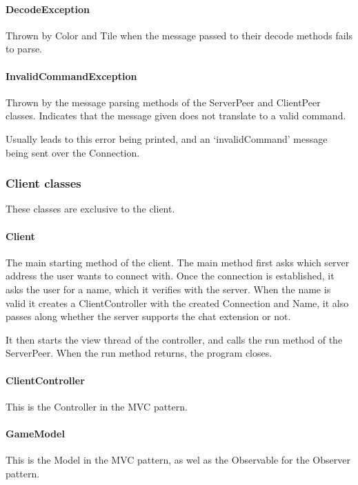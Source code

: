 \documentclass[12pt, letterpaper]{article}
\begin{document}
    \paragraph{DecodeException}
    Thrown by Color and Tile when the message passed to their decode methods fails to parse.

    \paragraph{InvalidCommandException}
    Thrown by the message parsing methods of the ServerPeer and ClientPeer classes.
    Indicates that the message given does not translate to a valid command.

    Usually leads to this error being printed, and an `invalidCommand' message being sent over the Connection.



    \subsubsection{Client classes}

    These classes are exclusive to the client.

    \paragraph{Client}
    The main starting method of the client.
    The main method first asks which server address the user wants to connect with.
    Once the connection is established, it asks the user for a name, which it verifies with the server.
    When the name is valid it creates a ClientController with the created Connection and Name, it also passes along
    whether the server supports the chat extension or not.

    It then starts the view thread of the controller, and calls the run method of the ServerPeer.
    When the run method returns, the program closes.

    \paragraph{ClientController}
    This is the Controller in the MVC pattern.

    \paragraph{GameModel}
    This is the Model in the MVC pattern, as wel as the Observable for the Observer pattern.
\end{document}
